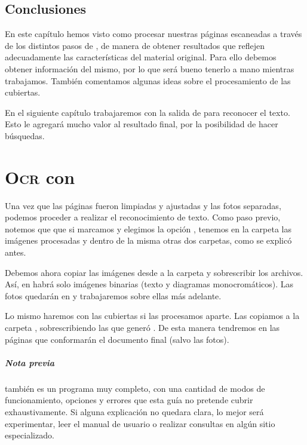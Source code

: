 \documentclass[%
	a5paper,
	10pt,
	twoside,
	openright,
	final,
]{memoir}
\begin{document}
{	\section{Conclusiones} En este capítulo hemos visto como procesar nuestras páginas escaneadas a través de los distintos pasos de \scantailor, de manera de obtener resultados que reflejen adecuadamente las características del material original. Para ello debemos obtener información del mismo, por lo que será bueno tenerlo a mano mientras trabajamos. También comentamos algunas ideas sobre el procesamiento de las cubiertas.

	En el siguiente capítulo trabajaremos con la salida de \scantailor para reconocer el texto. Esto le agregará mucho valor al resultado final, por la posibilidad de hacer búsquedas.

	\chapter{\texorpdfstring{\textsc{Ocr}}{OCR} con \abbyy\label{sec:OCR}} Una vez que las páginas fueron limpiadas y ajustadas y las fotos separadas, podemos proceder a realizar el reconocimiento de texto. Como paso previo, notemos que que si marcamos  y elegimos la opción , tenemos en la carpeta  las imágenes procesadas y dentro de la misma otras dos carpetas, como se explicó antes.

	Debemos ahora copiar las imágenes desde  a la carpeta  y sobrescribir los archivos. Así, en  habrá solo imágenes binarias (texto y diagramas monocromáticos). Las fotos quedarán en  y trabajaremos sobre ellas más adelante.

	Lo mismo haremos con las cubiertas si las procesamos aparte. Las copiamos a la carpeta , sobrescribiendo las que generó \scantailor. De esta manera tendremos en  las páginas que conformarán el documento final (salvo las fotos).

	\paragraph{Nota previa} \abbyy también es un programa muy completo, con una cantidad de modos de funcionamiento, opciones y errores que esta guía no pretende cubrir exhaustivamente. Si alguna explicación no quedara clara, lo mejor será experimentar, leer el manual de usuario o realizar consultas en algún sitio especializado.

}
\end{document}
